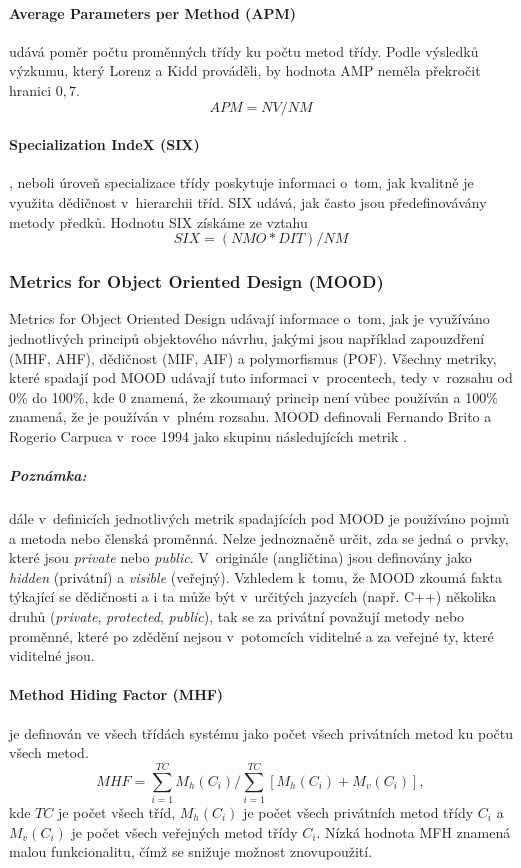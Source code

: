 \documentclass[11pt,twoside,a4paper]{book}
\begin{document}
\paragraph{Average Parameters per Method (APM)} udává poměr počtu proměnných třídy ku počtu metod třídy.
Podle výsledků výzkumu, který Lorenz a Kidd prováděli, by hodnota AMP neměla překročit hranici $0,7$.
$$APM = NV / NM$$

\paragraph{Specialization IndeX (SIX)}, neboli úroveň specializace třídy poskytuje informaci o~tom,
jak kvalitně je využita dědičnost v~hierarchii tříd. SIX udává, jak často jsou předefinovávány
metody předků. Hodnotu SIX získáme ze vztahu
$$SIX = (NMO * DIT) / NM$$

\subsubsection{Metrics for Object Oriented Design (MOOD)}
Metrics for Object Oriented Design udávají informace o~tom, jak je využíváno jednotlivých principů objektového návrhu,
jakými jsou například zapouzdření (MHF, AHF), dědičnost (MIF, AIF) a polymorfismus (POF). Všechny metriky, které spadají pod MOOD
udávají tuto informaci v~procentech, tedy v~rozsahu od 0\% do 100\%, kde 0 znamená, že zkoumaný princip
není vůbec používán a 100\% znamená, že je používán v~plném rozsahu.
MOOD definovali Fernando Brito a Rogerio Carpuca v~roce 1994 jako skupinu následujících metrik \cite{MOOD}.

\subparagraph{Poznámka:} dále v~definicích jednotlivých metrik spadajících pod MOOD je používáno pojmů  a  metoda nebo členská proměnná.
Nelze jednoznačně určit, zda se jedná o~prvky, které jsou \textit{private} nebo \textit{public}. V~originále (angličtina) jsou
definovány jako \textit{hidden} (privátní) a \textit{visible} (veřejný). Vzhledem k~tomu, že MOOD zkoumá fakta týkající se dědičnosti a i ta může
být v~určitých jazycích (např. C++) několika druhů (\textit{private}, \textit{protected}, \textit{public}), tak se za privátní považují metody
nebo proměnné, které po zdědění nejsou v~potomcích viditelné a za veřejné ty, které viditelné jsou.

\paragraph{Method Hiding Factor (MHF)} je definován ve všech třídách systému jako počet všech privátních metod ku počtu všech metod.
$$MHF = \sum_{i=1}^{TC}{M_h(C_i)} / \sum_{i=1}^{TC}{[M_h(C_i) + M_v(C_i)]},$$
kde $TC$ je počet všech tříd, $M_h(C_i)$ je počet všech privátních metod třídy $C_i$ a $M_v(C_i)$ je počet všech veřejných metod třídy $C_i$.
Nízká hodnota MFH znamená malou funkcionalitu, čímž se snižuje možnost znovupoužití.
\end{document}

